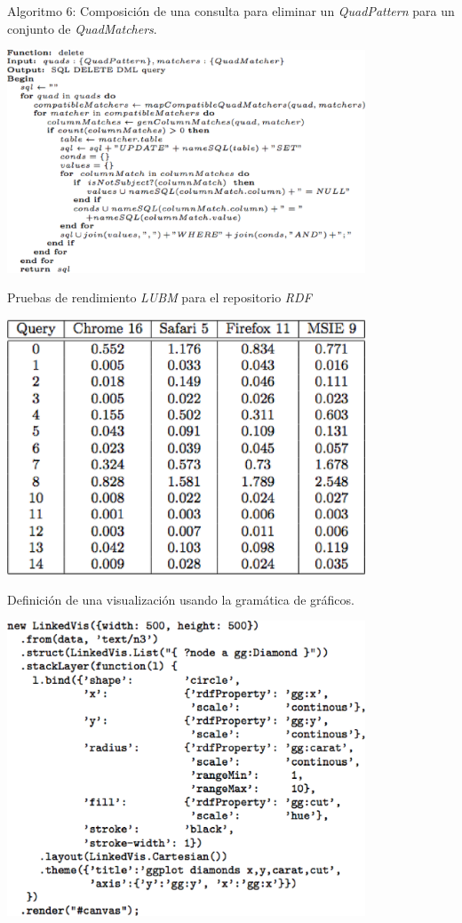 \begin{table}
\vspace{2.4in}
\caption{Algoritmo 6: Composici\'on de una consulta para eliminar un \textit{QuadPattern} para un conjunto de \textit{QuadMatchers}.}
\includegraphics[width=0.8\textwidth]{algoritmo6}
\label{alg6}
\end{table}
\clearpage
\newpage


\begin{table}
\vspace{2.4in}
\caption{Pruebas de rendimiento \textit{LUBM} para el repositorio \textit{RDF}}
\includegraphics[width=0.8\textwidth]{tabla12}
\label{tabla12}
\end{table}
\clearpage
\newpage


\begin{table}
\vspace{2.4in}
\caption{Definici\'on de una visualizaci\'on usando la gram\'atica de gr\'aficos.}
\includegraphics[width=0.8\textwidth]{tabla13}
\label{tabla13}
\end{table}
\clearpage
\newpage


